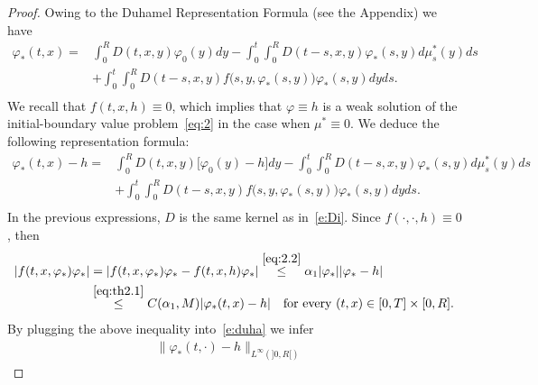 \documentclass[11pt,leqno]{amsart}
\numberwithin{equation}{section}
\begin{document}
\begin{proof}
Owing to the Duhamel Representation Formula (see the Appendix) we have 
\begin{equation}
\label{e:duha0}
\begin{split}
    {\varphi}_\ast (t, x)  = &
    \int_0^R D(t, x, y) {\varphi}_0(y)  dy -
    \int_0^t \! \! \int_0^R D(t-s, x, y) {\varphi}_\ast (s, y) d \mu^\ast_s (y) ds \\
    & +
    \int_0^t \! \! \int_0^R D(t-s, x, y) f \big (s, y, {\varphi}_\ast (s, y)\big)   
    {\varphi}_\ast(s, y) dy ds. \\
\end{split}
\end{equation}
We recall that $f(t, x, h) \equiv 0$, which implies that ${\varphi} \equiv h$ is a weak solution of the initial-boundary value problem~\eqref{eq:2} in the case when $\mu^\ast \equiv 0$. We deduce the following representation formula:
\begin{equation}
\label{e:duha}
\begin{split}
    {\varphi}_\ast (t, x) - h = &
    \int_0^R D(t, x, y) \big[ {\varphi}_0(y) -h \big] dy -
    \int_0^t \! \! \int_0^R D(t-s, x, y) {\varphi}_\ast (s, y) d \mu^\ast_s (y) ds \\
    & +
    \int_0^t \! \! \int_0^R D(t-s, x, y) f \big (s, y, {\varphi}_\ast (s, y)\big)   
    {\varphi}_\ast(s, y) dy ds. \\
\end{split}
\end{equation}
In the previous expressions, $D$ is the same kernel as in~\eqref{e:Di}.  
Since $f(\cdot, \cdot, h) \equiv 0$, then  
\begin{equation}
\label{e:effestar}
\begin{split}
    | f (t, x, {\varphi}_\ast )   
    {\varphi}_\ast   | & =
    | f  (t, x, {\varphi}_\ast )   
    {\varphi}_\ast - 
    f  (t, x, h )   
    {\varphi}_\ast     | \stackrel{\eqref{eq:2.2}}{\leq}
     \alpha_1 | {\varphi}_\ast || {\varphi}_\ast -h| \\
     & \stackrel{\eqref{eq:th2.1}}{\leq}  
     C(\alpha_1, M) | {\varphi}_\ast (t, x) -h| \quad
    \text{for every $(t, x) \in [0, T]\times [0, R]$}. 
    \end{split} 
\end{equation}
By plugging the above inequality into~\eqref{e:duha} we infer 
\begin{equation*}
  \begin{split}
    \| {\varphi}_\ast (t, \cdot) - h \|_{L^\infty (]0, R[)} &

\end{split}
\end{equation*}
\end{proof}
\end{document}

